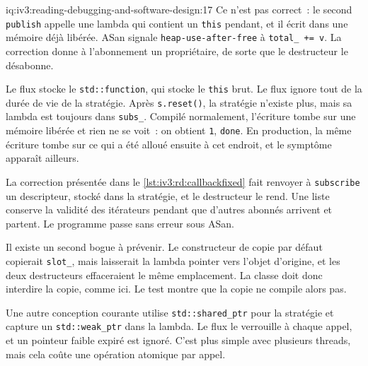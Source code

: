 \begin{solution}{iq:iv3:reading-debugging-and-software-design:17}
Ce n'est pas correct~: le second \texttt{publish} appelle une lambda qui contient un \texttt{this} pendant, et il écrit dans une mémoire déjà libérée. ASan signale \texttt{heap-use-after-free} à \texttt{total\_ += v}. La correction donne à l'abonnement un propriétaire, de sorte que le destructeur le désabonne.

Le flux stocke le \texttt{std::function}, qui stocke le \texttt{this} brut. Le flux ignore tout de la durée de vie de la stratégie. Après \texttt{s.reset()}, la stratégie n'existe plus, mais sa lambda est toujours dans \texttt{subs\_}. Compilé normalement, l'écriture tombe sur une mémoire libérée et rien ne se voit~: on obtient \texttt{1}, \texttt{done}. En production, la même écriture tombe sur ce qui a été alloué ensuite à cet endroit, et le symptôme apparaît ailleurs.

La correction présentée dans le \cref{lst:iv3:rd:callbackfixed} fait renvoyer à \texttt{subscribe} un descripteur, stocké dans la stratégie, et le destructeur le rend. Une liste conserve la validité des itérateurs pendant que d'autres abonnés arrivent et partent. Le programme passe sans erreur sous ASan.

Il existe un second bogue à prévenir. Le constructeur de copie par défaut copierait \texttt{slot\_}, mais laisserait la lambda pointer vers l'objet d'origine, et les deux destructeurs effaceraient le même emplacement. La classe doit donc interdire la copie, comme ici. Le test montre que la copie ne compile alors pas.

Une autre conception courante utilise \texttt{std::shared\_ptr} pour la stratégie et capture un \texttt{std::weak\_ptr} dans la lambda. Le flux le verrouille à chaque appel, et un pointeur faible expiré est ignoré. C'est plus simple avec plusieurs threads, mais cela coûte une opération atomique par appel.

\label{lst:iv3:rd:callbackfixed}


\end{solution}

